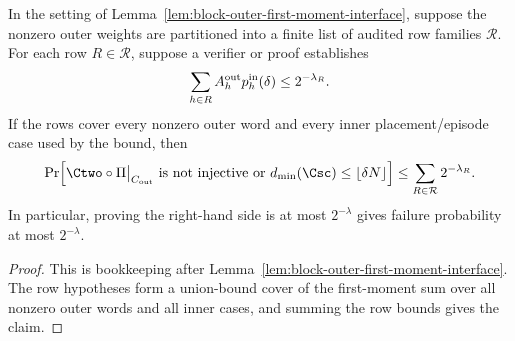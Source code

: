 \begin{lemma}
\label{lem:finite-block-certificate-template}
In the setting of Lemma~\ref{lem:block-outer-first-moment-interface}, suppose
the nonzero outer weights are partitioned into a finite list of audited row
families \(\mathcal R\).  For each row \(R\in\mathcal R\), suppose a verifier or
proof establishes
\[
\sum_{h\in R} A_h^{\mathrm{out}}p_h^{\rm in}(\delta)\le 2^{-\lambda_R}.
\]
If the rows cover every nonzero outer word and every inner placement/episode
case used by the bound, then
\[
\Pr\Bigl[
 \Ctwo\circ\Pi\big|_{C_{\mathrm{out}}}\text{ is not injective}
 \ \text{or}\ d_{\min}(\Csc)\le\lfloor\delta N\rfloor
\Bigr]
\le
\sum_{R\in\mathcal R}2^{-\lambda_R}.
\]
In particular, proving the right-hand side is at most \(2^{-\lambda}\) gives
failure probability at most \(2^{-\lambda}\).
\end{lemma}

\begin{proof}
This is bookkeeping after Lemma~\ref{lem:block-outer-first-moment-interface}.
The row hypotheses form a union-bound cover of the first-moment sum over all
nonzero outer words and all inner cases, and summing the row bounds gives the
claim.
\end{proof}
